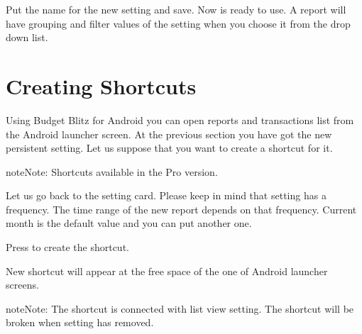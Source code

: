 \documentclass[a4paper,10pt,english]{sphinxmanual}
\begin{document}
Put the name  for the new setting and save. Now
 is ready to use. A report will have
grouping and filter values of the setting when you choose it from the
drop down list.

\noindent{}
\noindent{}


\section{Creating Shortcuts}
\label{\detokenize{shortcuts:creating-shortcuts}}
Using Budget Blitz for Android you can open reports and transactions list from the Android launcher screen. At the previous
section you have got the new persistent setting. Let us suppose that you want to create a shortcut for it.

\begin{sphinxadmonition}{note}{Note:}
Shortcuts available in the Pro version.
\end{sphinxadmonition}

Let us go back to the setting card. Please keep in mind that setting has a frequency. The time range of the
new report depends on that frequency. Current month is the default value and you can put another one.

Press  to create the shortcut.

\noindent{}
\noindent{}

New shortcut will appear at the free space of the one of Android launcher screens.

\begin{sphinxadmonition}{note}{Note:}
The shortcut is connected with list view setting. The shortcut will be broken when setting has removed.
\end{sphinxadmonition}

\noindent{}
\noindent{}
\noindent{}
\end{document}
